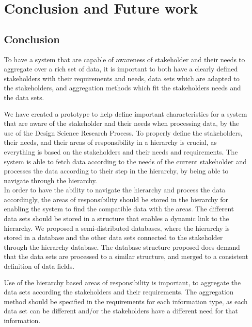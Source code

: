 \chapter{Conclusion and Future work}
\label{chapter:conclusion}

\section{Conclusion} %
\label{sec:conclusion}
To have a system that are capable of awareness of stakeholder and their needs
to aggregate over a rich set of data, it is important to both have a clearly
defined stakeholders with their requirements and needs, data sets which are 
adapted to the stakeholders, and aggregation methods which fit the 
stakeholders needs and the data sets. 

We have created a prototype to help define important characteristics for a
system that are aware of the stakeholder and their needs when processing data,
by the use of the Design Science Research Process. To properly define the 
stakeholders, their needs, and their areas of responsibility in a hierarchy is 
crucial, as everything is based on the stakeholders and their needs and 
requirements. The system is able to fetch data according to the needs of the 
current stakeholder and processes the data according to their step in the
hierarchy, by being able to navigate through the hierarchy. \\

In order to have the ability to navigate the hierarchy and process the data 
accordingly, the areas of responsibility should be stored in the hierarchy for 
enabling the system to find the compatible data with the areas. The different
data sets should be stored in a structure that enables a dynamic link to the
hierarchy. We proposed a semi-distributed databases, where the hierarchy is
stored in a database and the other data sets connected to the stakeholder
through the hierarchy database. The database structure proposed does demand
that the data sets are processed to a similar structure, and merged to a
consistent definition of data fields. 

Use of the hierarchy based areas of responsibility is important, to aggregate 
the data sets according the stakeholders and their requirements. The 
aggregation method should be specified in the requirements for each 
information type, as each data set can be different and/or the stakeholders 
have a different need for that information.

